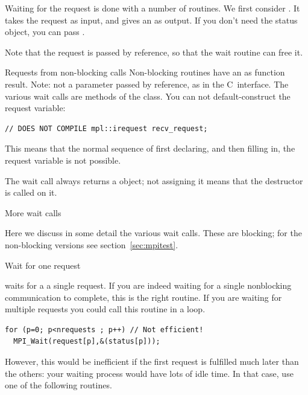 Waiting for the request is done with a number of routines. We first
consider . It takes the request as input, and
gives an  as output. If you don't need the
status object, you can pass .


Note that the request is passed by reference, so that the wait routine
can free it.

\begin{mplnote}{Requests from non-blocking calls}
  \label{mpl:irequest}
  Non-blocking routines have an  as function result.
  Note: not a parameter passed by reference, as in the C~interface.
  The various wait calls are methods of the 
  class.
  You can not default-construct the request variable:
\begin{lstlisting}
// DOES NOT COMPILE mpl::irequest recv_request;
\end{lstlisting}
This means that the normal sequence of first declaring, and then filling in,
the request variable is not possible.

\begin{mplimpl}
  The wait call always returns a  object;
  not assigning it means that the destructor is called on it.
\end{mplimpl}
\end{mplnote}

 {More wait calls}
\label{sec:waittest}

Here we discuss in some detail the various wait calls.
These are blocking; for the non-blocking versions
see section~\ref{sec:mpitest}.

 {Wait for one request}

 waits for a a single request. If you are
indeed waiting for a single nonblocking communication to complete,
this is the right routine. If you are waiting for multiple requests
you could call this routine in a loop.

\begin{lstlisting}
for (p=0; p<nrequests ; p++) // Not efficient!
  MPI_Wait(request[p],&(status[p]));
\end{lstlisting}

However, this would be inefficient if the first request is fulfilled
much later than the others: your waiting process would have lots of
idle time. In that case, use one of the following routines.

